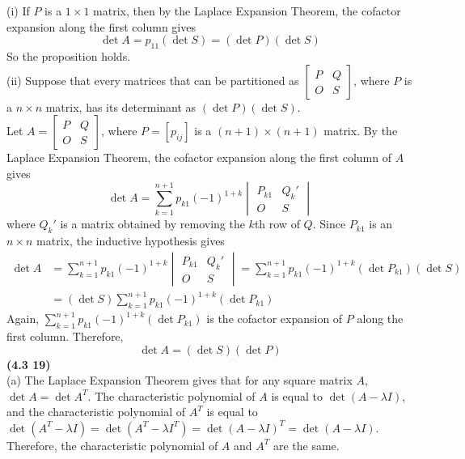 (i) If $P$ is a $1 \times 1$ matrix, then by the Laplace Expansion Theorem, the cofactor expansion along the first column gives \begin{equation*}
	\det{A} = p_{11}(\det{S}) = (\det{P})(\det{S})
\end{equation*} So the proposition holds. \\

(ii) Suppose that every matrices that can be partitioned as $\begin{bmatrix}
	P & Q \\ O & S
\end{bmatrix}$, where $P$ is a $n \times n$ matrix, has its determinant as $(\det{P})(\det{S})$. \\

Let $A = \begin{bmatrix}
	P & Q \\ O & S
\end{bmatrix}$, where $P=[p_{ij}]$ is a $(n+1) \times (n+1)$ matrix. By the Laplace Expansion Theorem, the cofactor expansion along the first column of $A$ gives \begin{equation*}
	\det{A} = \sum_{k=1}^{n+1}p_{k1}(-1)^{1+k}\begin{vmatrix}
		P_{k1} & Q_k' \\ O & S
	\end{vmatrix}
\end{equation*}
where $Q_k'$ is a matrix obtained by removing the $k$th row of $Q$. Since $P_{k1}$ is an $n \times n$ matrix, the inductive hypothesis gives \begin{align*}
	\det{A} &= \sum_{k=1}^{n+1}p_{k1}(-1)^{1+k}\begin{vmatrix}
		P_{k1} & Q_k' \\ O & S
	\end{vmatrix} =  \sum_{k=1}^{n+1}p_{k1}(-1)^{1+k}(\det{P_{k1}})(\det{S}) \\
	&= (\det{S})\sum_{k=1}^{n+1}p_{k1}(-1)^{1+k}(\det{P_{k1}})
\end{align*}
Again, $\sum_{k=1}^{n+1}p_{k1}(-1)^{1+k}(\det{P_{k1}})$ is the cofactor expansion of $P$ along the first column. Therefore, \begin{equation*}
	\det{A} = (\det{S})(\det{P})
\end{equation*}
\textbf{(4.3 19)} \\
(a) The Laplace Expansion Theorem gives that for any square matrix $A$, $\det{A} = \det{A^T}$. The characteristic polynomial of $A$ is equal to $\det{(A - \lambda I)}$, and the characteristic polynomial of $A^T$ is equal to $\det{(A^T - \lambda I)} = \det{(A^T - \lambda I^T)} = \det{(A - \lambda I)^T} = \det{(A - \lambda I)}$. Therefore, the characteristic polynomial of $A$ and $A^T$ are the same. \\

